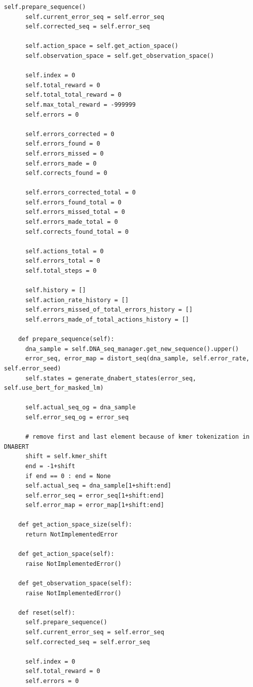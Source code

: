 \documentclass[oneside,bibliography=totocnumbered,BCOR=5mm]{scrbook}%
\theoremstyle{definition}
\theoremstyle{definition}
\theoremstyle{definition}
\theoremstyle{definition}
\theoremstyle{definition}
\theoremstyle{definition}
\begin{document}
\begin{appendix}
\begin{lstlisting}[caption={DNA-Environment Basisklasse}]
      self.prepare_sequence()
      self.current_error_seq = self.error_seq
      self.corrected_seq = self.error_seq

      self.action_space = self.get_action_space()
      self.observation_space = self.get_observation_space()

      self.index = 0
      self.total_reward = 0
      self.total_total_reward = 0
      self.max_total_reward = -999999
      self.errors = 0

      self.errors_corrected = 0
      self.errors_found = 0
      self.errors_missed = 0
      self.errors_made = 0
      self.corrects_found = 0

      self.errors_corrected_total = 0
      self.errors_found_total = 0
      self.errors_missed_total = 0
      self.errors_made_total = 0
      self.corrects_found_total = 0

      self.actions_total = 0
      self.errors_total = 0
      self.total_steps = 0

      self.history = []
      self.action_rate_history = []
      self.errors_missed_of_total_errors_history = []
      self.errors_made_of_total_actions_history = []

    def prepare_sequence(self):
      dna_sample = self.DNA_seq_manager.get_new_sequence().upper()
      error_seq, error_map = distort_seq(dna_sample, self.error_rate, self.error_seed)
      self.states = generate_dnabert_states(error_seq, self.use_bert_for_masked_lm)

      self.actual_seq_og = dna_sample
      self.error_seq_og = error_seq

      # remove first and last element because of kmer tokenization in DNABERT
      shift = self.kmer_shift
      end = -1+shift
      if end == 0 : end = None
      self.actual_seq = dna_sample[1+shift:end]
      self.error_seq = error_seq[1+shift:end]
      self.error_map = error_map[1+shift:end]

    def get_action_space_size(self):
      return NotImplementedError

    def get_action_space(self):
      raise NotImplementedError()

    def get_observation_space(self):
      raise NotImplementedError()

    def reset(self):
      self.prepare_sequence()
      self.current_error_seq = self.error_seq
      self.corrected_seq = self.error_seq

      self.index = 0
      self.total_reward = 0
      self.errors = 0
      

\end{lstlisting}
\end{appendix}
\end{document}
